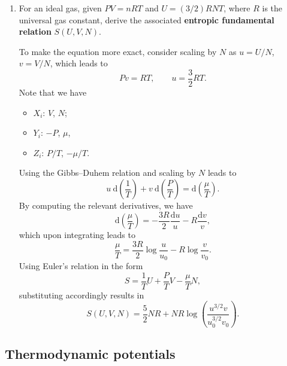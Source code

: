 \documentclass[letter-paper]{tufte-book}
\newcommand\Def[1]{\textbf{#1}}
\begin{document}
\begin{enumerate}
  \item For an ideal gas, given $PV = nRT$ and $U = (3/2)RNT$, where $R$ is the
  universal gas constant, derive the associated \Def{entropic fundamental
  relation} $S(U,V,N)$.

  To make the equation more exact, consider scaling by $N$ as $u = U/N$, $v =
  V/N$, which leads to
  \begin{equation*}
    Pv = RT, \qquad u = \frac{3}{2}RT.
  \end{equation*}
  Note that we have
  \begin{itemize}
    \item $X_i$: $V$, $N$;
    \item $Y_i$: $-P$, $\mu$,
    \item $Z_i$: $P/T$, $-\mu / T$.
  \end{itemize}
  Using the Gibbs--Duhem relation and scaling by $N$ leads to
  \begin{equation*}
    u\ \mathrm{d}\left(\frac{1}{T}\right) + v\ \mathrm{d}\left(\frac{P}{T}\right) = \mathrm{d}\left(\frac{\mu}{T}\right).
  \end{equation*}
  By computing the relevant derivatives, we have
  \begin{equation*}
    \mathrm{d}\left(\frac{\mu}{T}\right) = -\frac{3R}{2}\frac{\mathrm{d}u}{u} - R\frac{\mathrm{d}v}{v},
  \end{equation*}
  which upon integrating leads to
  \begin{equation*}
    \frac{\mu}{T} = \frac{3R}{2} \log\frac{u}{u_0} - R \log\frac{v}{v_0}.
  \end{equation*}
  Using Euler's relation in the form
  \begin{equation*}
    S = \frac{1}{T}U + \frac{P}{T}V - \frac{\mu}{T}N,
  \end{equation*}
  substituting accordingly results in
  \begin{equation*}
    S(U,V,N) = \frac{5}{2}NR + NR \log\left(\frac{u^{3/2}v}{u_0^{3/2}v_0}\right).
  \end{equation*}
\end{enumerate}


\subsection{Thermodynamic potentials}
\end{document}
